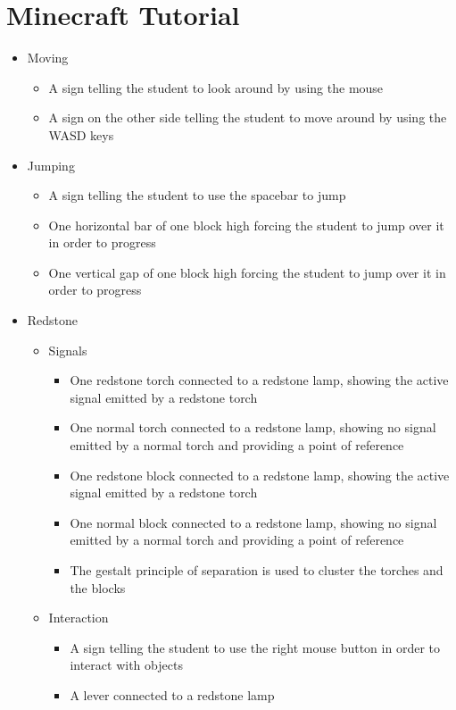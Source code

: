 \documentclass[11pt,twoside]{report} %
\begin{document}
\section{Minecraft Tutorial}

\begin{itemize}
	\item Moving
	\begin{itemize}
		\item A sign telling the student to look around by using the mouse
		\item A sign on the other side telling the student to move around by using the WASD keys
	\end{itemize}
	\item Jumping
	\begin{itemize}
		\item A sign telling the student to use the spacebar to jump
		\item One horizontal bar of one block high forcing the student to jump over it in order to progress
		\item One vertical gap of one block high forcing the student to jump over it in order to progress
	\end{itemize}
	\item Redstone
	\begin{itemize}
		\item Signals
		\begin{itemize}
			\item One redstone torch connected to a redstone lamp, showing the active signal emitted by a redstone torch
			\item One normal torch connected to a redstone lamp, showing no signal emitted by a normal torch and providing a point of reference
			\item One redstone block connected to a redstone lamp, showing the active signal emitted by a redstone torch
			\item One normal block connected to a redstone lamp, showing no signal emitted by a normal torch and providing a point of reference
			\item The gestalt principle of separation is used to cluster the torches and the blocks
		\end{itemize}
		\item Interaction
		\begin{itemize}
			\item A sign telling the student to use the right mouse button in order to interact with objects
			\item A lever connected to a redstone lamp

\end{itemize}
\end{itemize}
\end{itemize}
\end{document}
